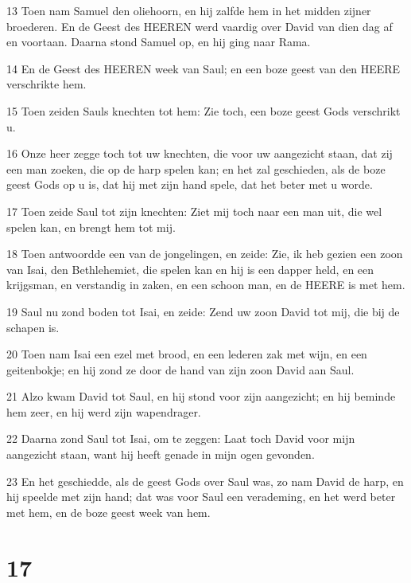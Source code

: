 \par 13 Toen nam Samuel den oliehoorn, en hij zalfde hem in het midden zijner broederen. En de Geest des HEEREN werd vaardig over David van dien dag af en voortaan. Daarna stond Samuel op, en hij ging naar Rama.
\par 14 En de Geest des HEEREN week van Saul; en een boze geest van den HEERE verschrikte hem.
\par 15 Toen zeiden Sauls knechten tot hem: Zie toch, een boze geest Gods verschrikt u.
\par 16 Onze heer zegge toch tot uw knechten, die voor uw aangezicht staan, dat zij een man zoeken, die op de harp spelen kan; en het zal geschieden, als de boze geest Gods op u is, dat hij met zijn hand spele, dat het beter met u worde.
\par 17 Toen zeide Saul tot zijn knechten: Ziet mij toch naar een man uit, die wel spelen kan, en brengt hem tot mij.
\par 18 Toen antwoordde een van de jongelingen, en zeide: Zie, ik heb gezien een zoon van Isai, den Bethlehemiet, die spelen kan en hij is een dapper held, en een krijgsman, en verstandig in zaken, en een schoon man, en de HEERE is met hem.
\par 19 Saul nu zond boden tot Isai, en zeide: Zend uw zoon David tot mij, die bij de schapen is.
\par 20 Toen nam Isai een ezel met brood, en een lederen zak met wijn, en een geitenbokje; en hij zond ze door de hand van zijn zoon David aan Saul.
\par 21 Alzo kwam David tot Saul, en hij stond voor zijn aangezicht; en hij beminde hem zeer, en hij werd zijn wapendrager.
\par 22 Daarna zond Saul tot Isai, om te zeggen: Laat toch David voor mijn aangezicht staan, want hij heeft genade in mijn ogen gevonden.
\par 23 En het geschiedde, als de geest Gods over Saul was, zo nam David de harp, en hij speelde met zijn hand; dat was voor Saul een verademing, en het werd beter met hem, en de boze geest week van hem.

\chapter{17}

